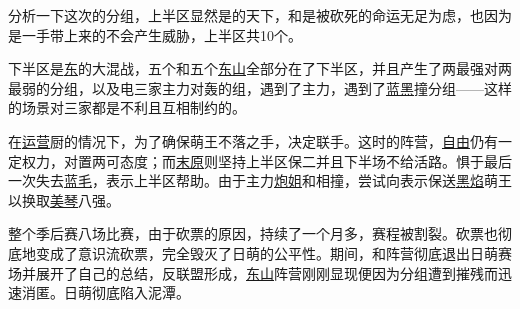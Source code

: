 分析一下这次的分组，上半区显然是的天下，和是被砍死的命运无足为虑，也因为是一手带上来的不会产生威胁，上半区共10个。

下半区是\uline{东}的大混战，五个和五个\uline{东山}全部分在了下半区，并且产生了两最强对两最弱的分组，以及电三家主力对轰的组，遇到了主力，遇到了\uline{蓝}\uline{黑}撞分组——这样的场景对三家都是不利且互相制约的。

在\uline{运营}厨的情况下，为了确保萌王不落之手，决定联手。这时的阵营，\uline{自由}仍有一定权力，对置两可态度；而\uline{末原}则坚持上半区保二并且下半场不给活路。惧于最后一次失去\uline{蓝毛}，表示上半区帮助。由于主力\uline{炮姐}和相撞，尝试向表示保送\uline{黑焰}萌王以换取\uline{美琴}八强。

整个季后赛八场比赛，由于砍票的原因，持续了一个月多，赛程被割裂。砍票也彻底地变成了意识流砍票，完全毁灭了日萌的公平性。期间，和阵营彻底退出日萌赛场并展开了自己的总结，反联盟形成，\uline{东山}阵营刚刚显现便因为分组遭到摧残而迅速消匿。日萌彻底陷入泥潭。

\newpage


